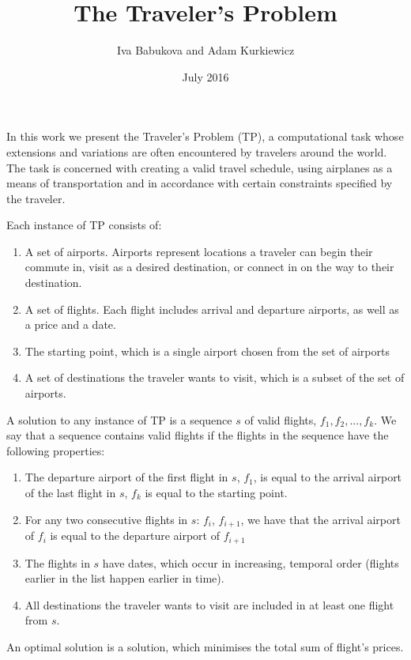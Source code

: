 \documentclass{article}
\title{The Traveler's Problem}
\author{Iva Babukova and Adam Kurkiewicz}
\date{July 2016}
\theoremstyle{definition}
\begin{document}
\maketitle
In this work we present the Traveler's Problem (TP), a computational task whose extensions and variations are often encountered by travelers around the world. The task is concerned with creating a valid travel schedule, using airplanes as a means of transportation and in accordance with certain constraints specified by the traveler.

Each instance of TP consists of:

\begin{enumerate}
\item A set of airports. Airports represent locations a traveler can begin their commute in, visit as a desired destination, or connect in on the way to their destination.
\item A set of flights. Each flight includes arrival and departure airports, as well as a price and a date.
\item The starting point, which is a single airport chosen from the set of airports
\item A set of destinations the traveler wants to visit, which is a subset of the set of airports.
\end{enumerate}

A solution to any instance of TP is a sequence $s$ of valid flights, ${f_{1}, f_{2}, ..., f_{k}}$. We say that a sequence contains valid flights if the flights in the sequence have the following properties:

\begin{enumerate}
\item The departure airport of the first flight in $s$, $f_{1}$, is equal to the arrival airport of the last flight in $s$, $f_{k}$ is equal to the starting point.
\item For any two consecutive flights in $s$: $f_{i}$, $f_{i+1}$, we have that the arrival airport of $f_{i}$ is equal to the departure airport of $f_{i+1}$
\item The flights in $s$ have dates, which occur in increasing, temporal order (flights earlier in the list happen earlier in time).
\item All destinations the traveler wants to visit are included in at least one flight from $s$.
\end{enumerate}

An optimal solution is a solution, which minimises the total sum of flight's prices.
\end{document}
